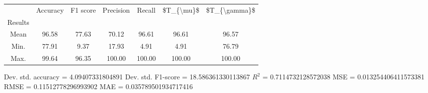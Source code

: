 \begin{tabular}{|c|c|c|c|c|c|c|}
\toprule
{} &  Accuracy &  F1 score &  Precision &  Recall &  \$T\_\{\textbackslash mu\}\$ &  \$T\_\{\textbackslash gamma\}\$ \\
Results &           &           &            &         &            &               \\
\hline
Mean    &     96.58 &     77.63 &      70.12 &   96.61 &      96.61 &         96.57 \\
Min.    &     77.91 &      9.37 &      17.93 &    4.91 &       4.91 &         76.79 \\
Max.    &     99.64 &     96.35 &     100.00 &  100.00 &     100.00 &        100.00 \\
\bottomrule
\end{tabular}

 Dev. std. accuracy = 4.09407331804891
 Dev. std. F1-score = 18.586361330113867
 $R^2$ = 0.7114732128572038
 MSE = 0.013254406411573381
 RMSE = 0.11512778296993902
 MAE = 0.035789501934717416